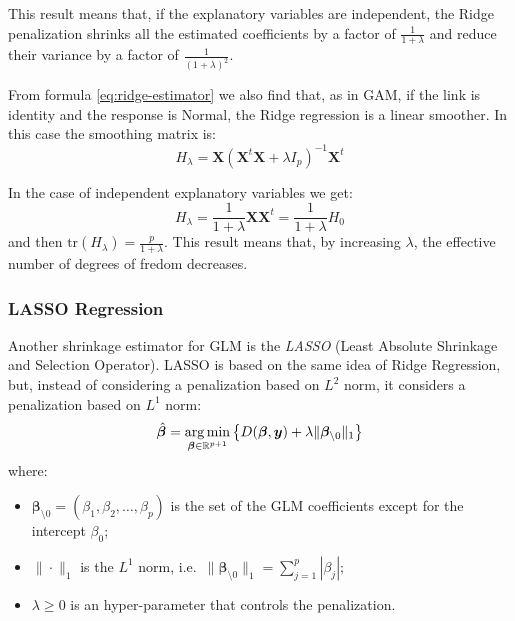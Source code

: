 \documentclass[a4paper, nobind]{templates/ociamthesis}
\providecommand{\tightlist}{%
  \setlength{\itemsep}{0pt}\setlength{\parskip}{0pt}}
\theoremstyle{definition}
\theoremstyle{definition}
\theoremstyle{definition}
\theoremstyle{remark}
\begin{document}
This result means that, if the explanatory variables are independent, the Ridge penalization shrinks all the estimated coefficients by a factor of \(\frac{1}{1+\lambda}\) and reduce their variance by a factor of \(\frac{1}{\left(1+\lambda\right)^2}\).

From formula \eqref{eq:ridge-estimator} we also find that, as in GAM, if the link is identity and the response is Normal, the Ridge regression is a linear smoother. In this case the smoothing matrix is:
\[
H_{\lambda} = \boldsymbol{X} \left(\boldsymbol{X}^t\boldsymbol{X}+\lambda I_p\right)^{-1}\boldsymbol{X}^t
\]

In the case of independent explanatory variables we get:
\[
H_{\lambda} = \frac{1}{1+\lambda} \boldsymbol{X} \boldsymbol{X}^t = \frac{1}{1+\lambda} H_0
\]
and then \(\text{tr}\left(H_{\lambda}\right) = \frac{p}{1+\lambda}\). This result means that, by increasing \(\lambda\), the effective number of degrees of fredom decreases.

\hypertarget{lasso-regression}{%
\subsubsection{LASSO Regression}\label{lasso-regression}}

Another shrinkage estimator for GLM is the \emph{LASSO} (Least Absolute Shrinkage and Selection Operator). LASSO is based on the same idea of Ridge Regression, but, instead of considering a penalization based on \(L^2\) norm, it considers a penalization based on \(L^1\) norm:
\begin{equation}
\label{eq:lasso-est-deviance}
\hat{\boldsymbol{\beta}} = \operatorname*{arg\,min}_{\boldsymbol{\beta}\in\mathbb{R}^{p+1}}{\left\{D(\boldsymbol{\beta}, \boldsymbol{y}) + \lambda \|\boldsymbol{\beta}_{\setminus0}\|_1\right\}}
\end{equation}
where:

\begin{itemize}
\tightlist
\item
  \(\boldsymbol{\beta}_{\setminus0} = \left(\beta_1, \beta_2, \dots, \beta_p\right)\) is the set of the GLM coefficients except for the intercept \(\beta_0\);
\item
  \(\|\cdot\|_1\) is the \(L^1\) norm, i.e.~\(\|\boldsymbol{\beta}_{\setminus0}\|_1 = \sum_{j=1}^p{|\beta_j|}\);
\item
  \(\lambda\ge0\) is an hyper-parameter that controls the penalization.
\end{itemize}
\end{document}
